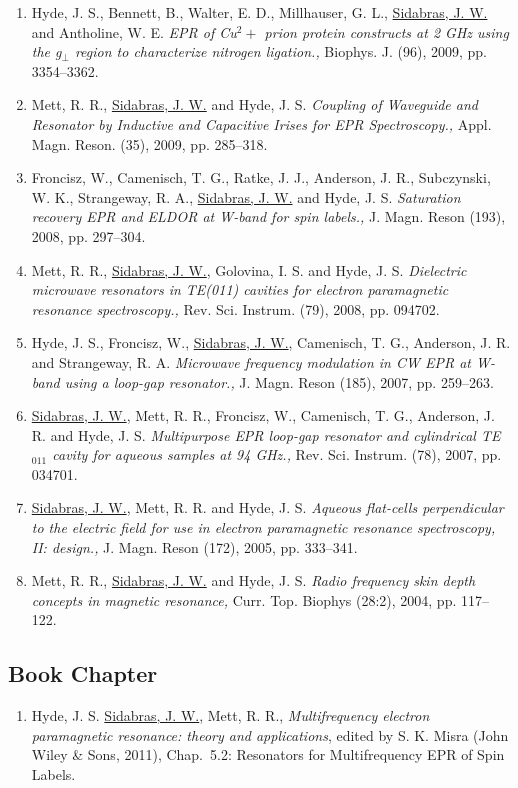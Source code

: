 \begin{enumerate}
    \item Hyde, J. S., Bennett, B., Walter, E. D., Millhauser, G. L., \underline{Sidabras, J. W.} and Antholine, W. E. \textit{EPR of Cu$^2+$ prion protein constructs at 2 GHz using the g$_\perp$ region to characterize nitrogen ligation.,} Biophys. J. (96), 2009, pp. 3354--3362.
    \item Mett, R. R., \underline{Sidabras, J. W.} and Hyde, J. S. \textit{Coupling of Waveguide and Resonator by Inductive and Capacitive Irises for EPR Spectroscopy.,} Appl. Magn. Reson. (35), 2009, pp. 285--318.
    \item Froncisz, W., Camenisch, T. G., Ratke, J. J., Anderson, J. R., Subczynski, W. K., Strangeway, R. A., \underline{Sidabras, J. W.} and Hyde, J. S. \textit{Saturation recovery EPR and ELDOR at W-band for spin labels.,} J. Magn. Reson (193), 2008, pp. 297--304.
    \item Mett, R. R., \underline{Sidabras, J. W.}, Golovina, I. S. and Hyde, J. S. \textit{Dielectric microwave resonators in TE(011) cavities for electron paramagnetic resonance spectroscopy.,} Rev. Sci. Instrum. (79), 2008, pp. 094702.
    \item Hyde, J. S., Froncisz, W., \underline{Sidabras, J. W.}, Camenisch, T. G., Anderson, J. R. and Strangeway, R. A. \textit{Microwave frequency modulation in CW EPR at W-band using a loop-gap resonator.,} J. Magn. Reson (185), 2007, pp. 259--263.
    \item \underline{Sidabras, J. W.}, Mett, R. R., Froncisz, W., Camenisch, T. G., Anderson, J. R. and Hyde, J. S. \textit{Multipurpose EPR loop-gap resonator and cylindrical TE$_{011}$ cavity for aqueous samples at 94 GHz.,} Rev. Sci. Instrum. (78), 2007, pp. 034701.
    \item \underline{Sidabras, J. W.}, Mett, R. R. and Hyde, J. S. \textit{Aqueous flat-cells perpendicular to the electric field for use in electron paramagnetic resonance spectroscopy, II: design.,} J. Magn. Reson (172), 2005, pp. 333--341.
    \item Mett, R. R., \underline{Sidabras, J. W.} and Hyde, J. S. \textit{Radio frequency skin depth concepts in magnetic resonance,} Curr. Top. Biophys (28:2), 2004, pp. 117--122.
\end{enumerate}



\subsection*{Book Chapter}
\begin{enumerate}
\itemsep0em 
    \item Hyde, J. S. \underline{Sidabras, J. W.}, Mett, R. R., \textit{Multifrequency electron paramagnetic resonance: theory and applications}, edited by S. K. Misra (John Wiley \& Sons, 2011), Chap.~5.2: Resonators for Multifrequency EPR of Spin Labels.
\end{enumerate}

